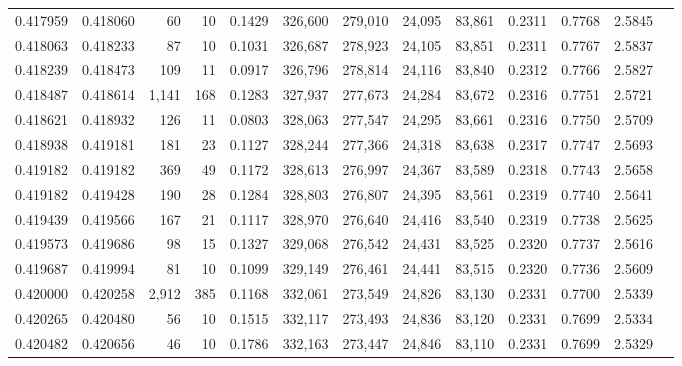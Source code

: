 \begin{tabular}{rrrrrrrrrrrrr}
0.417959 & 0.418060 &    60 &  10 &                                     0.1429 & 326,600 & 279,010 &  24,095 &  83,861 & 0.2311 & 0.7768 & 2.5845 \\
0.418063 & 0.418233 &    87 &  10 &                                     0.1031 & 326,687 & 278,923 &  24,105 &  83,851 & 0.2311 & 0.7767 & 2.5837 \\
0.418239 & 0.418473 &   109 &  11 &                                     0.0917 & 326,796 & 278,814 &  24,116 &  83,840 & 0.2312 & 0.7766 & 2.5827 \\
0.418487 & 0.418614 & 1,141 & 168 &                                     0.1283 & 327,937 & 277,673 &  24,284 &  83,672 & 0.2316 & 0.7751 & 2.5721 \\
0.418621 & 0.418932 &   126 &  11 &                                     0.0803 & 328,063 & 277,547 &  24,295 &  83,661 & 0.2316 & 0.7750 & 2.5709 \\
0.418938 & 0.419181 &   181 &  23 &                                     0.1127 & 328,244 & 277,366 &  24,318 &  83,638 & 0.2317 & 0.7747 & 2.5693 \\
0.419182 & 0.419182 &   369 &  49 &                                     0.1172 & 328,613 & 276,997 &  24,367 &  83,589 & 0.2318 & 0.7743 & 2.5658 \\
0.419182 & 0.419428 &   190 &  28 &                                     0.1284 & 328,803 & 276,807 &  24,395 &  83,561 & 0.2319 & 0.7740 & 2.5641 \\
0.419439 & 0.419566 &   167 &  21 &                                     0.1117 & 328,970 & 276,640 &  24,416 &  83,540 & 0.2319 & 0.7738 & 2.5625 \\
0.419573 & 0.419686 &    98 &  15 &                                     0.1327 & 329,068 & 276,542 &  24,431 &  83,525 & 0.2320 & 0.7737 & 2.5616 \\
0.419687 & 0.419994 &    81 &  10 &                                     0.1099 & 329,149 & 276,461 &  24,441 &  83,515 & 0.2320 & 0.7736 & 2.5609 \\
0.420000 & 0.420258 & 2,912 & 385 &                                     0.1168 & 332,061 & 273,549 &  24,826 &  83,130 & 0.2331 & 0.7700 & 2.5339 \\
0.420265 & 0.420480 &    56 &  10 &                                     0.1515 & 332,117 & 273,493 &  24,836 &  83,120 & 0.2331 & 0.7699 & 2.5334 \\
0.420482 & 0.420656 &    46 &  10 &                                     0.1786 & 332,163 & 273,447 &  24,846 &  83,110 & 0.2331 & 0.7699 & 2.5329 \\

\end{tabular}
